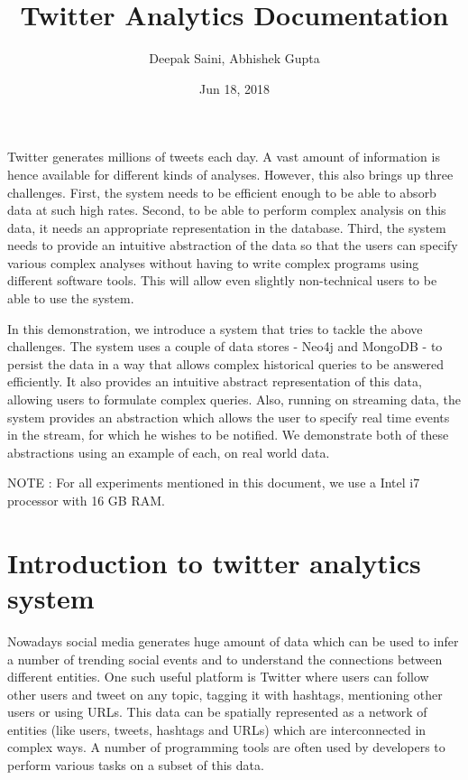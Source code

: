 \documentclass[letterpaper,10pt,english]{sphinxmanual}
\title{Twitter Analytics Documentation}
\date{Jun 18, 2018}
\author{Deepak Saini, Abhishek Gupta}
\begin{document}
\maketitle
\sphinxtableofcontents
{}\label{\detokenize{index::doc}}


Twitter generates millions of tweets each day. A vast amount of information is hence available for different kinds of analyses. However, this also brings up three challenges. First, the system needs to be efficient enough to be able to absorb data at such high rates. Second, to be able to perform complex analysis on this data, it needs an appropriate representation in the database. Third, the system needs to provide an intuitive abstraction of the data so that the users can specify various complex analyses without having to write complex programs using different software tools. This will allow even slightly non-technical users to be able to use the system.

In this demonstration, we introduce a system that tries to tackle the above challenges. The system uses a couple of data stores - Neo4j and MongoDB - to persist the data in a way that allows complex historical queries to be answered efficiently. It also provides an intuitive abstract representation of this data, allowing users to formulate complex queries. Also, running on streaming data, the system provides an abstraction which allows the user to specify real time events in the stream, for which he wishes to be notified. We demonstrate both of these abstractions using an example of each, on real world data.

NOTE : For all experiments mentioned in this document, we use a Intel i7 processor with 16 GB RAM.


\chapter{Introduction to twitter analytics system}
\label{\detokenize{introduction:introduction-to-twitter-analytics-system}}\label{\detokenize{introduction::doc}}
Nowadays social media generates huge amount of data which can be used to infer a number of trending social events and to understand the connections between different entities. One such useful platform is Twitter where users can follow other users and tweet on any topic, tagging it with hashtags, mentioning other users or using URLs. This data can be spatially represented as a network of entities (like users, tweets, hashtags and URLs) which are interconnected in complex ways. A number of programming tools are often used by developers to perform various tasks on a subset of this data.
\end{document}
